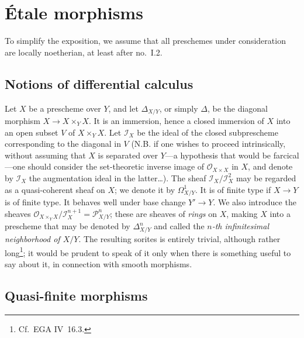 \documentclass[11pt,oneside]{amsbook}
\begin{document}
\tableofcontents

\mainmatter
\setcounter{chapter}{0}
\chapter{Étale morphisms}
\label{I}

To simplify the exposition, we assume that all preschemes under
consideration are locally noetherian, at least after no.~I.2.

\section{Notions of differential calculus}
\label{I.1}

Let \(X\) be a prescheme over \(Y\), and let \(\Delta_{X/Y}\), or simply
\(\Delta\),\label{indnot:ab} be the diagonal morphism
\(X\to X\times_Y X\).  It is an
immersion, hence a closed immersion of \(X\) into an open subset \(V\) of
\(X\times_Y X\).  Let \(\mathcal I_X\) be the ideal of the closed
subprescheme corresponding to the diagonal in \(V\) (N.B. if one wishes to
proceed intrinsically, without assuming that \(X\) is separated over
\(Y\)---a hypothesis that would be farcical---one should consider the
set-theoretic inverse image of \(\mathcal O_{X\times X}\) in \(X\), and
denote by \(\mathcal I_X\) the augmentation ideal in the latter\ldots).
The sheaf \(\mathcal I_X/\mathcal I_X^2\) may be regarded as a
quasi-coherent sheaf on \(X\); we denote it by \(\Omega^1_{X/Y}\).  It is
\label{indnot:ac}
of finite type if \(X\to Y\) is of finite type.  It behaves well under base
change \(Y'\to Y\).  We also introduce the sheaves
\(\mathcal O_{X\times_Y X}/\mathcal I_X^{n+1}=\mathcal P^n_{X/Y}\);\label{indnot:ad} these
are sheaves of \emph{rings} on \(X\), making \(X\) into a prescheme that
may be denoted by \(\Delta^n_{X/Y}\)\label{indnot:ae} and called the \emph{\(n\)-th
infinitesimal neighborhood of \(X/Y\)}.  The resulting sorites is entirely
trivial, although rather long\footnote{Cf.\ EGA IV~16.3.}; it would be
prudent to speak of it only when there is something useful to say about it,
in connection with smooth morphisms.

\section{Quasi-finite morphisms}
\label{I.2}
\end{document}
